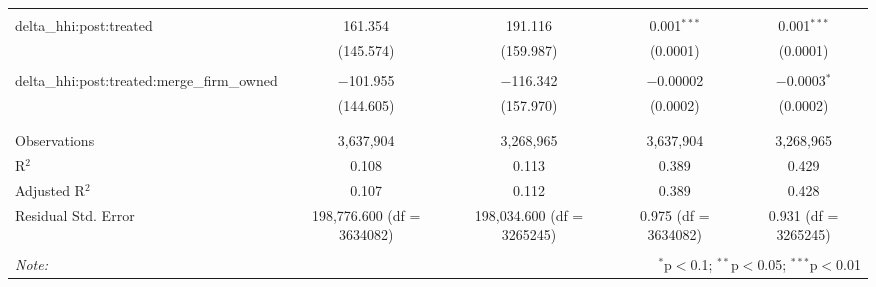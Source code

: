 \begin{table}[H]
{\begin{tabular}{@{\extracolsep{5pt}}lcccc}
   & & & & \\  

  delta\_hhi:post:treated & 161.354 & 191.116 & 0.001$^{***}$ & 0.001$^{***}$ \\  

   & (145.574) & (159.987) & (0.0001) & (0.0001) \\  

   & & & & \\  

  delta\_hhi:post:treated:merge\_firm\_owned & $-$101.955 & $-$116.342 & $-$0.00002 & $-$0.0003$^{*}$ \\  

   & (144.605) & (157.970) & (0.0002) & (0.0002) \\  

   & & & & \\  

 \hline \\[-1.8ex]  

 Observations & 3,637,904 & 3,268,965 & 3,637,904 & 3,268,965 \\  

 R$^{2}$ & 0.108 & 0.113 & 0.389 & 0.429 \\  

 Adjusted R$^{2}$ & 0.107 & 0.112 & 0.389 & 0.428 \\  

 Residual Std. Error & 198,776.600 (df = 3634082) & 198,034.600 (df = 3265245) & 0.975 (df = 3634082) & 0.931 (df = 3265245) \\  

 \hline  

 \hline \\[-1.8ex]  

 \textit{Note:}  & \multicolumn{4}{r}{$^{*}$p$<$0.1; $^{**}$p$<$0.05; $^{***}$p$<$0.01} \\  

 \end{tabular}}  

 \end{table}  

 



